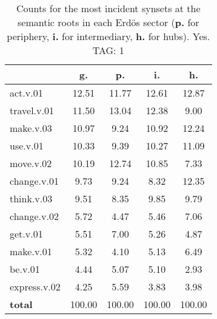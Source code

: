 \begin{table}[h!]
\begin{center}
\begin{tabular}{| l | c | c | c | c |}\hline
 & g. & p. & i. & h. \\\hline
act.v.01 & 12.51  & 11.77  & 12.61  & 12.87 \\\hline
travel.v.01 & 11.50  & 13.04  & 12.38  & 9.00 \\\hline
make.v.03 & 10.97  & 9.24  & 10.92  & 12.24 \\\hline
use.v.01 & 10.33  & 9.39  & 10.27  & 11.09 \\\hline
move.v.02 & 10.19  & 12.74  & 10.85  & 7.33 \\\hline
change.v.01 & 9.73  & 9.24  & 8.32  & 12.35 \\\hline
think.v.03 & 9.51  & 8.35  & 9.85  & 9.79 \\\hline
change.v.02 & 5.72  & 4.47  & 5.46  & 7.06 \\\hline
get.v.01 & 5.51  & 7.00  & 5.26  & 4.87 \\\hline
make.v.01 & 5.32  & 4.10  & 5.13  & 6.49 \\\hline
be.v.01 & 4.44  & 5.07  & 5.10  & 2.93 \\\hline
express.v.02 & 4.25  & 5.59  & 3.83  & 3.98 \\\hline
{{\bf total}} & 100.00  & 100.00  & 100.00  & 100.00 \\\hline
\end{tabular}
\caption{Counts for the most incident synsets at the semantic roots in each Erd\"os sector ({\bf p.} for periphery, {\bf i.} for intermediary, {\bf h.} for hubs). Yes. TAG: 1}
\end{center}
\end{table}